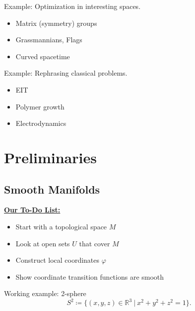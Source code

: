 \documentclass[UKenglish]{beamer}
\newcommand{\R}{\mathbb{R}}
\begin{document}
\begin{frame}{}
	\vfill
	Example: Optimization in interesting spaces.
	\pause
	\begin{itemize}
		\item Matrix (symmetry) groups
		\pause
		\item Grassmannians, Flags
		\pause
		\item Curved spacetime
	\end{itemize}
	\vfill
\end{frame}

\begin{frame}{}
	\vfill
	Example: Rephrasing classical problems.
	\pause
	\begin{itemize}
		\item EIT
		\pause
		\item Polymer growth
		\pause
		\item Electrodynamics
	\end{itemize}
	\vfill
\end{frame}

\section{Preliminaries}


\subsection{Smooth Manifolds}

\begin{frame}{}
\vfill
\textbf{\underline{Our To-Do List:}}
\begin{itemize}
	\item Start with a topological space $M$
	\pause
	\item Look at open sets $U$ that cover $M$
	\pause
	\item Construct local coordinates $\varphi$
	\pause
	\item Show coordinate transition functions are smooth
\end{itemize}
\vfill
\end{frame}

\begin{frame}{}
	\vfill
	Working example: 2-sphere
	\[
		S^2 \coloneqq \{(x,y,z) \in \R^3 ~\vert~ x^2+y^2+z^2=1\}.
	\]
	\vfill
\end{frame}

\begin{frame}{}
\vfill
\begin{figure}[H]
	\centering
	\def\svgwidth{0.75\columnwidth}
	
\end{figure}\vfill
\end{frame}
\end{document}
